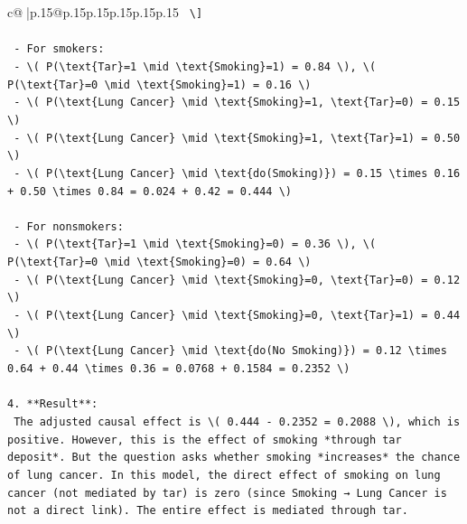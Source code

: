 \documentclass{article}
\begin{document}
{\begin{supertabular}{c@{$\;$}|p{.15\linewidth}@{}p{.15\linewidth}p{.15\linewidth}p{.15\linewidth}p{.15\linewidth}p{.15\linewidth}}
{{{\texttt{   \textbackslash{}{]}} \\
\\ 
\texttt{   {-} For smokers:  } \\
\texttt{     {-} \textbackslash{}( P(\textbackslash{}text\{Tar\}=1 \textbackslash{}mid \textbackslash{}text\{Smoking\}=1) = 0.84 \textbackslash{}), \textbackslash{}( P(\textbackslash{}text\{Tar\}=0 \textbackslash{}mid \textbackslash{}text\{Smoking\}=1) = 0.16 \textbackslash{})  } \\
\texttt{     {-} \textbackslash{}( P(\textbackslash{}text\{Lung Cancer\} \textbackslash{}mid \textbackslash{}text\{Smoking\}=1, \textbackslash{}text\{Tar\}=0) = 0.15 \textbackslash{})  } \\
\texttt{     {-} \textbackslash{}( P(\textbackslash{}text\{Lung Cancer\} \textbackslash{}mid \textbackslash{}text\{Smoking\}=1, \textbackslash{}text\{Tar\}=1) = 0.50 \textbackslash{})  } \\
\texttt{     {-} \textbackslash{}( P(\textbackslash{}text\{Lung Cancer\} \textbackslash{}mid \textbackslash{}text\{do(Smoking)\}) = 0.15 \textbackslash{}times 0.16 + 0.50 \textbackslash{}times 0.84 = 0.024 + 0.42 = 0.444 \textbackslash{})} \\
\\ 
\texttt{   {-} For nonsmokers:  } \\
\texttt{     {-} \textbackslash{}( P(\textbackslash{}text\{Tar\}=1 \textbackslash{}mid \textbackslash{}text\{Smoking\}=0) = 0.36 \textbackslash{}), \textbackslash{}( P(\textbackslash{}text\{Tar\}=0 \textbackslash{}mid \textbackslash{}text\{Smoking\}=0) = 0.64 \textbackslash{})  } \\
\texttt{     {-} \textbackslash{}( P(\textbackslash{}text\{Lung Cancer\} \textbackslash{}mid \textbackslash{}text\{Smoking\}=0, \textbackslash{}text\{Tar\}=0) = 0.12 \textbackslash{})  } \\
\texttt{     {-} \textbackslash{}( P(\textbackslash{}text\{Lung Cancer\} \textbackslash{}mid \textbackslash{}text\{Smoking\}=0, \textbackslash{}text\{Tar\}=1) = 0.44 \textbackslash{})  } \\
\texttt{     {-} \textbackslash{}( P(\textbackslash{}text\{Lung Cancer\} \textbackslash{}mid \textbackslash{}text\{do(No Smoking)\}) = 0.12 \textbackslash{}times 0.64 + 0.44 \textbackslash{}times 0.36 = 0.0768 + 0.1584 = 0.2352 \textbackslash{})} \\
\\ 
\texttt{4. **Result**:  } \\
\texttt{   The adjusted causal effect is \textbackslash{}( 0.444 {-} 0.2352 = 0.2088 \textbackslash{}), which is positive. However, this is the effect of smoking *through tar deposit*. But the question asks whether smoking *increases* the chance of lung cancer. In this model, the direct effect of smoking on lung cancer (not mediated by tar) is zero (since Smoking → Lung Cancer is not a direct link). The entire effect is mediated through tar.  } \\
}}}
\end{supertabular}}
\end{document}
